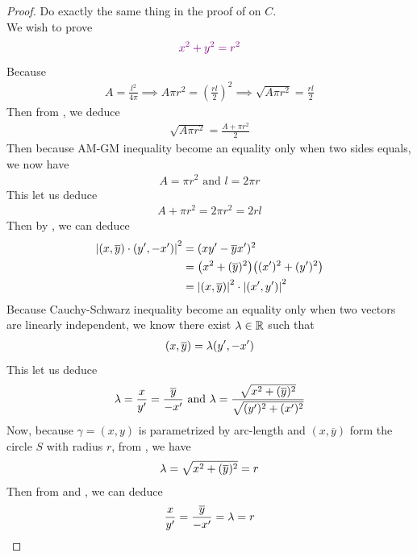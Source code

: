 \documentclass{report}
\begin{document}
\begin{proof}
Do exactly the same thing in the proof of  on $C$.\\

We wish to prove 
\begin{align*}
  \textcolor{violet}{x^2+y^2=r^2}
\end{align*}
Because 
\begin{align*}
A=\frac{l^2}{4\pi}\implies A\pi r^2=(\frac{rl}{2})^2 \implies \sqrt{A\pi r^2}=\frac{rl}{2} 
\end{align*}
Then from , we deduce
\begin{align*}
\sqrt{A\pi r^2}=\frac{A+ \pi r^2 }{2}
\end{align*}
Then because AM-GM inequality become an equality only when two sides equals, we now have 
\begin{align*}
A=\pi r^2\text{ and }l=2\pi r
\end{align*}
This let us deduce 
\begin{align*}
A+\pi r^2=2\pi r^2=2rl
\end{align*}
Then by , we can deduce 
\begin{align*}
\left|(x,\overline{y})\cdot (y',-x')\right|^2&=(xy'-\overline{y}x')^2\\
  &=\big(x^2+(\overline{y})^2 \big)\big((x')^2+(y')^2 \big)\\
  &=\left|(x,\overline{y})\right|^2 \cdot \left|(x',y')\right|^2
\end{align*}
Because Cauchy-Schwarz inequality become an equality only when two vectors are linearly independent, we know there exist $\lambda \in\mathbb{R}$ such that 
\begin{align*}
  (x,\overline{y})=\lambda (y',-x')
\end{align*}
This let us deduce 
\begin{align}
\label{ldxy}
\lambda =\frac{x}{y'}=\frac{\overline{y}}{-x'}\text{ and }\lambda =\frac{\sqrt{x^2+(\overline{y})^2}
 }{\sqrt{(y')^2 + (x')^2}}
\end{align}
Now, because $\gamma =(x,y)$ is parametrized by arc-length and $(x, \overline{y})$ form the circle $S$ with radius $r$, from , we have 
\begin{align}
\label{ldsq}
\lambda = \sqrt{x^2+(\overline{y})^2} =r
\end{align}
Then from  and , we can deduce 
\begin{align*}
\frac{x}{y'}=\frac{\overline{y}}{-x'}=\ld  =r

\end{align*}
\end{proof}
\end{document}
